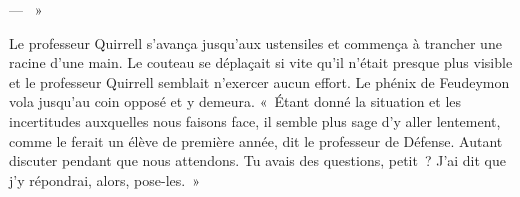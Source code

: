 --- ~»

Le professeur Quirrell s'avança jusqu'aux ustensiles et commença à trancher une racine d'une main. Le couteau se déplaçait si vite qu'il n'était presque plus visible et le professeur Quirrell semblait n'exercer aucun effort. Le phénix de Feudeymon vola jusqu'au coin opposé et y demeura. «~Étant donné la situation et les incertitudes auxquelles nous faisons face, il semble plus sage d'y aller lentement, comme le ferait un élève de première année, dit le professeur de Défense. Autant discuter pendant que nous attendons. Tu avais des questions, petit~? J'ai dit que j'y répondrai, alors, pose-les.~»
